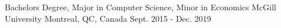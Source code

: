 

\begin{cventries}

  \cventry
    {Bachelors Degree, Major in Computer Science, Minor in Economics} %
    {McGill University} %
    {} %
    {Montreal, QC, Canada} %
    {Sept. 2015 - Dec. 2019} %
    {
      \begin{cvitems} %
      \end{cvitems}
    }

\end{cventries}
